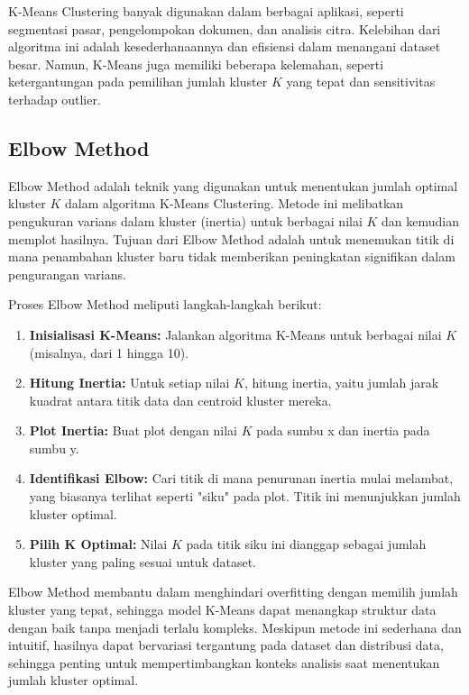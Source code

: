 K-Means Clustering banyak digunakan dalam berbagai aplikasi, seperti segmentasi pasar, pengelompokan dokumen, dan analisis citra. Kelebihan dari algoritma ini adalah kesederhanaannya dan efisiensi dalam menangani dataset besar. Namun, K-Means juga memiliki beberapa kelemahan, seperti ketergantungan pada pemilihan jumlah kluster \(K\) yang tepat dan sensitivitas terhadap outlier.

\subsection{Elbow Method}
Elbow Method adalah teknik yang digunakan untuk menentukan jumlah optimal kluster \(K\) dalam algoritma K-Means Clustering. Metode ini melibatkan pengukuran varians dalam kluster (inertia) untuk berbagai nilai \(K\) dan kemudian memplot hasilnya. Tujuan dari Elbow Method adalah untuk menemukan titik di mana penambahan kluster baru tidak memberikan peningkatan signifikan dalam pengurangan varians.

Proses Elbow Method meliputi langkah-langkah berikut:
\begin{enumerate}
    \item \textbf{Inisialisasi K-Means:} Jalankan algoritma K-Means untuk berbagai nilai \(K\) (misalnya, dari 1 hingga 10).
    \item \textbf{Hitung Inertia:} Untuk setiap nilai \(K\), hitung inertia, yaitu jumlah jarak kuadrat antara titik data dan centroid kluster mereka.
    \item \textbf{Plot Inertia:} Buat plot dengan nilai \(K\) pada sumbu x dan inertia pada sumbu y.
    \item \textbf{Identifikasi Elbow:} Cari titik di mana penurunan inertia mulai melambat, yang biasanya terlihat seperti "siku" pada plot. Titik ini menunjukkan jumlah kluster optimal.
    \item \textbf{Pilih K Optimal:} Nilai \(K\) pada titik siku ini dianggap sebagai jumlah kluster yang paling sesuai untuk dataset.
\end{enumerate}

Elbow Method membantu dalam menghindari overfitting dengan memilih jumlah kluster yang tepat, sehingga model K-Means dapat menangkap struktur data dengan baik tanpa menjadi terlalu kompleks. Meskipun metode ini sederhana dan intuitif, hasilnya dapat bervariasi tergantung pada dataset dan distribusi data, sehingga penting untuk mempertimbangkan konteks analisis saat menentukan jumlah kluster optimal.

